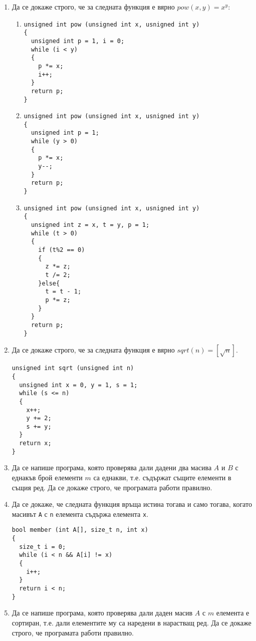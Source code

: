 \documentclass[12pt,a4paper]{article}
\newcommand{\code}[1]{\texttt{#1}}
\begin{document}
\begin{enumerate}
  \item Да се докаже строго, че за следната функция е вярно $pow(x,y)=x^y$:
  \begin{enumerate}[label=\alph*)]%

    \item
\begin{verbatim}
unsigned int pow (unsigned int x, usnigned int y)
{
  unsigned int p = 1, i = 0;
  while (i < y)
  {
    p *= x;
    i++;
  }
  return p;
}
\end{verbatim}
    \item
\begin{verbatim}
unsigned int pow (unsigned int x, usnigned int y)
{
  unsigned int p = 1;
  while (y > 0)
  {
    p *= x;
    y--;
  }
  return p;
}
\end{verbatim}
      \item
\begin{verbatim}
unsigned int pow (unsigned int x, usnigned int y)
{
  unsigned int z = x, t = y, p = 1;
  while (t > 0)
  {
    if (t%2 == 0)
    {
      z *= z;
      t /= 2;
    }else{
      t = t - 1;
      p *= z;
    }
  }
  return p;
}
\end{verbatim}
  \end{enumerate}

  \item Да се докаже строго, че за следната функция е вярно $sqrt(n)=[\sqrt{n}]$.

\begin{verbatim}
unsigned int sqrt (unsigned int n)
{
  unsigned int x = 0, y = 1, s = 1;
  while (s <= n)
  {
    x++;
    y += 2;
    s += y;
  }
  return x;
}
\end{verbatim}

\item Да се напише програма, която проверява дали дадени два масива $A$ и $B$ с еднакъв брой елементи $m$ са еднакви, т.е. съдържат същите елементи в същия ред. Да се докаже строго, че програмата работи правилно.

\item Да се докаже, че следната функция връща истина тогава и само тогава, когато масивът \code{A} с \code{n} елемента съдържа елемента \code{x}.

\begin{verbatim}
bool member (int A[], size_t n, int x)
{
  size_t i = 0;
  while (i < n && A[i] != x)
  {
    i++;
  }
  return i < n;
}
\end{verbatim}

\item Да се напише програма, която проверява дали даден масив $A$ с $m$ елемента е сортиран, т.е. дали елементите му са наредени в нарастващ ред. Да се докаже строго, че програмата работи правилно.

\end{enumerate}
\end{document}
